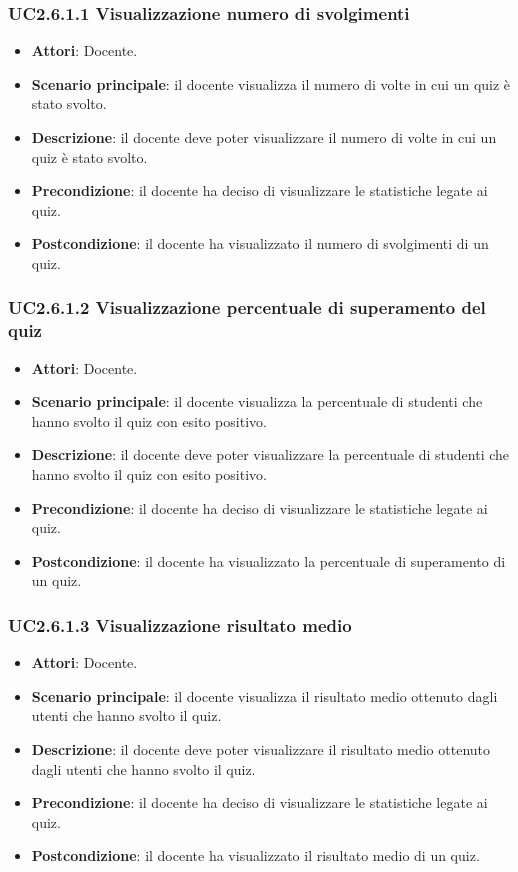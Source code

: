 \subsubsection{UC2.6.1.1 Visualizzazione numero di svolgimenti}
\begin{itemize}
\item \textbf{Attori}: Docente.
\item \textbf{Scenario principale}: il docente visualizza il numero di volte in cui un quiz è stato svolto.
\item \textbf{Descrizione}: il docente deve poter visualizzare il numero di volte in cui un quiz è stato svolto.
\item \textbf{Precondizione}: il docente ha deciso di visualizzare le statistiche legate ai quiz.
\item \textbf{Postcondizione}: il docente ha visualizzato il numero di svolgimenti di un quiz.
\end{itemize}
\subsubsection{UC2.6.1.2 Visualizzazione percentuale di superamento del quiz}
\begin{itemize}
\item \textbf{Attori}: Docente.
\item \textbf{Scenario principale}: il docente visualizza la percentuale di studenti che hanno svolto il quiz con esito positivo.
\item \textbf{Descrizione}: il docente deve poter visualizzare la percentuale di studenti che hanno svolto il quiz con esito positivo.
\item \textbf{Precondizione}: il docente ha deciso di visualizzare le statistiche legate ai quiz.
\item \textbf{Postcondizione}: il docente ha visualizzato la percentuale di superamento di un quiz.
\end{itemize}
\subsubsection{UC2.6.1.3 Visualizzazione risultato medio}
\begin{itemize}
\item \textbf{Attori}: Docente.
\item \textbf{Scenario principale}: il docente visualizza il risultato medio ottenuto dagli utenti che hanno svolto il quiz.
\item \textbf{Descrizione}: il docente deve poter visualizzare il risultato medio ottenuto dagli utenti che hanno svolto il quiz.
\item \textbf{Precondizione}: il docente ha deciso di visualizzare le statistiche legate ai quiz.
\item \textbf{Postcondizione}: il docente ha visualizzato il risultato medio di un quiz.
\end{itemize}
